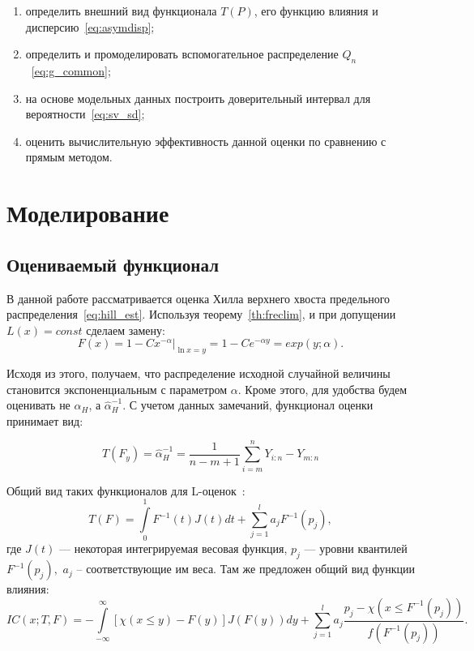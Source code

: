 \documentclass[12pt, specialist, subf, substylefile = spbu.rtx]{disser}
\begin{document}
\begin{enumerate}

\item определить внешний вид функционала $T(P)$, его функцию влияния и дисперсию~\eqref{eq:asymdisp};

\item определить и промоделировать вспомогательное распределение $Q_n$~\eqref{eq:g_common};

\item на основе модельных данных построить доверительный интервал для вероятности~\eqref{eq:sv_sd};

\item оценить вычислительную эффективность данной оценки по сравнению с прямым методом.

\end{enumerate}

\chapter{Моделирование}

\section{Оцениваемый функционал}

В данной работе рассматривается оценка Хилла верхнего хвоста предельного распределения~\eqref{eq:hill_est}. Используя теорему~\ref{th:freclim}, и при допущении $L(x)=const$ сделаем замену:
\begin{equation}\label{eq:rep_xy}
F(x)=1-Cx^{-\alpha}|_{\ln x=y}=1-Ce^{-\alpha y}=exp(y; \alpha).
\end{equation}

Исходя из этого, получаем, что распределение исходной случайной величины становится экспоненциальным с параметром $\alpha$. Кроме этого, для удобства будем оценивать не $\hat{\alpha}_H$, а $\hat{\alpha}_H^{-1}$. С учетом данных замечаний, функционал оценки принимает вид:

\begin{equation}\label{eq:t_f_y}
T(F_y)=\hat{\alpha}_H^{-1}=\frac{1}{n-m+1} \sum\limits_{i=m}^n Y_{i:n}- Y_{m:n}
\end{equation}


Общий вид таких функционалов для L-оценок~\cite[стр.~263]{Serfling}:
\begin{equation}\label{eq:t_f_common}
T(F)=\int\limits_0^1 F^{-1}(t)J(t)dt + \sum\limits_{j=1}^l a_jF^{-1}(p_j),
\end{equation}
где $J(t)$ --- некоторая интегрируемая весовая функция, $p_j$ --- уровни квантилей $F^{-1}(p_j),$ $a_j$ -- соответствующие им веса. Там же предложен общий вид функции влияния:
$$
IC(x; T, F)=-\int\limits_{-\infty}^\infty [\chi(x \le y) - F(y)]J(F(y))dy+ \sum\limits_{j=1}^l a_j\frac{p_j-\chi(x \le F^{-1}(p_j))}{f(F^{-1}(p_j))}.
$$
\end{document}
